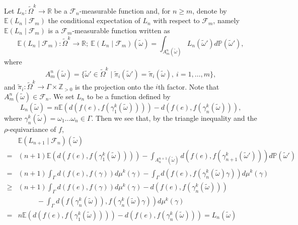 \documentclass[12pt]{amsart}
\numberwithin{equation}{section}
\theoremstyle{plain}
\theoremstyle{definition}
\theoremstyle{remark}
\newcommand{\R}{{\mathbb R}}
\newcommand{\Z}{{\mathbb Z}}
\begin{document}
 Let $L_n \colon \tilde\Omega^k \rightarrow \R$ be a 
 $\mathcal{F}_n$-measurable function and, for $n\geq m$, denote 
 by $\mathbb{E}(L_n \mid \mathcal{F}_{m})$ the conditional
 expectation of $L_n$ with respect to $\mathcal{F}_{m}$, namely 
 $\mathbb{E}(L_n\mid \mathcal{F}_{m})$ is 
 a $\mathcal{F}_{m}$-measurable function written as 
\begin{equation*}
 \mathbb{E}(L_n \mid \mathcal{F}_{m})\colon \tilde \Omega^k  
  \rightarrow \R ;
  \ \mathbb{E}(L_n \mid \mathcal{F}_{m})(\tilde\omega)
   = \int_{A_{m}^n(\tilde\omega)} L_n (\tilde\omega') 
      d\mathbb{P}(\tilde\omega'), 
\end{equation*}
where
\begin{equation*}
 A_{m}^n(\tilde\omega)=\{\tilde\omega' \in \tilde \Omega^k \mid 
 \tilde \pi_i(\tilde\omega')=\tilde \pi_i(\tilde\omega),\ i=1,\dots, m\}, 
\end{equation*}
 and $\tilde\pi_i\colon\tilde\Omega^k\rightarrow\Gamma\times\Z_{>0}$
 is the projection onto the $i$th factor.  
 Note that $A_{m}^n(\tilde\omega)\in \mathcal{F}_n$. 
 We set $L_n$ to be a function defined by
\begin{equation*}
 L_n(\tilde\omega) = n \mathbb{E}(d(f(e),f(\gamma_{1}^k(\tilde\omega))))
  - d(f(e),f(\gamma_n^k(\tilde\omega))), 
\end{equation*}
 where $\gamma_n^k(\tilde\omega)=\omega_1 \dots \omega_n \in \Gamma$. 
 Then we see that, by the triangle inequality and the
 $\rho$-equivariance of $f$, 
\begin{equation*}
\begin{split}
 & \mathbb{E}(L_{n+1}\mid \mathcal{F}_n)(\tilde\omega) \\
 =& (n+1)\mathbb{E}(d(f(e),f(\gamma_1^k(\tilde\omega)))) 
 - \int_{A_n^{n+1}(\tilde\omega)} 
    d(f(e),f(\gamma_{n+1}^k(\tilde\omega')))
   d\mathbb{P}(\tilde\omega') \\
 =& (n+1)\int_{\Gamma} d(f(e),f(\gamma)) d\mu^k(\gamma)
 - \int_{\Gamma} d(f(e),f(\gamma_n^k(\tilde\omega)\gamma))
 d\mu^k(\gamma) \\
 \geq &  (n+1)\int_{\Gamma}d(f(e),f(\gamma)) d\mu^k(\gamma) 
   -  d(f(e),f(\gamma_n^k(\tilde\omega)))  \\
& \phantom{==}
  -  \int_{\Gamma}d(f(\gamma_n^k(\tilde\omega)), 
          f(\gamma_n^k(\tilde\omega) \gamma)) d\mu^k(\gamma) \\
 =& n \mathbb{E}(d(f(e),f(\gamma_1^k(\tilde\omega)))) 
     -d(f(e),f(\gamma_n^k(\tilde\omega))) = L_n(\tilde\omega)
\end{split}
\end{equation*} 
\end{document}
